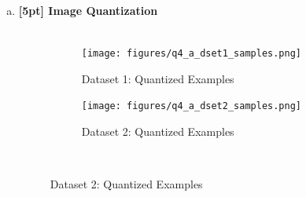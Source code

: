 \documentclass{article}
\begin{document}
\newpage
{}

\begin{enumerate}[(a)]
\item {\bf [5pt] Image Quantization} \\\\
\begin{figure}[H]
    \centering
    \begin{subfigure}{0.45\textwidth}
        \centering
        \texttt{[image: figures/q4\_a\_dset1\_samples.png]}
        \caption{Dataset 1: Quantized Examples}
    \end{subfigure}
    \hspace{0.2in}
    \begin{subfigure}{0.45\textwidth}
        \centering
        \texttt{[image: figures/q4\_a\_dset2\_samples.png]}
        \caption{Dataset 2: Quantized Examples}
    \end{subfigure} \\
\end{figure}


\end{enumerate}
\end{document}

